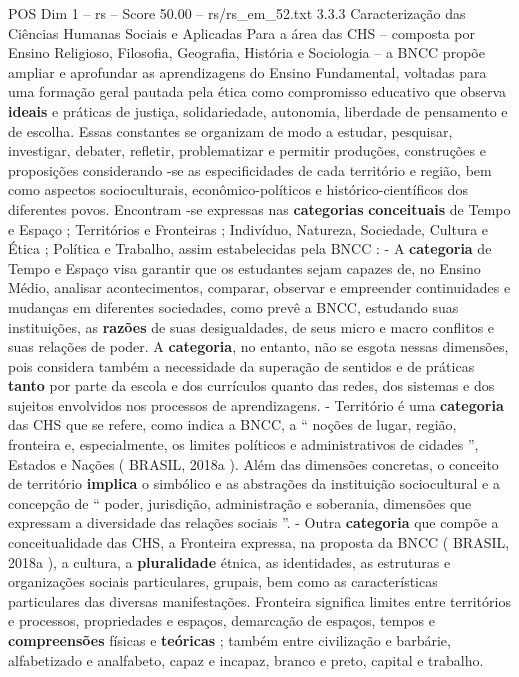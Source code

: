 \begin{textsample}{POS Dim 1 – rs – Score 50.00 – rs/rs\_em\_52.txt}  \label{ex:f1_pos_204}
3.3.3 Caracterização das Ciências Humanas Sociais e Aplicadas Para a área das CHS – composta por Ensino Religioso, Filosofia, Geografia, História e Sociologia – a BNCC propõe ampliar e aprofundar as aprendizagens do Ensino Fundamental, voltadas para uma formação geral pautada pela ética como compromisso educativo que observa \textbf{ideais} e práticas de justiça, solidariedade, autonomia, liberdade de pensamento e de escolha.
Essas constantes se organizam de modo a estudar, pesquisar, investigar, debater, refletir, problematizar e permitir produções, construções e proposições considerando -se as especificidades de cada território e região, bem como aspectos socioculturais, econômico-políticos e histórico-científicos dos diferentes povos.
Encontram -se expressas nas \textbf{categorias} \textbf{conceituais} de Tempo e Espaço ; Territórios e Fronteiras ; Indivíduo, Natureza, Sociedade, Cultura e Ética ; Política e Trabalho, assim estabelecidas pela BNCC : - A \textbf{categoria} de Tempo e Espaço visa garantir que os estudantes sejam capazes de, no Ensino Médio, analisar acontecimentos, comparar, observar e empreender continuidades e mudanças em diferentes sociedades, como prevê a BNCC, estudando suas instituições, as \textbf{razões} de suas desigualdades, de seus micro e macro conflitos e suas relações de poder.
A \textbf{categoria}, no entanto, não se esgota nessas dimensões, pois considera também a necessidade da superação de sentidos e de práticas \textbf{tanto} por parte da escola e dos currículos quanto das redes, dos sistemas e dos sujeitos envolvidos nos processos de aprendizagens. - Território é uma \textbf{categoria} das CHS que se refere, como indica a BNCC, a “ noções de lugar, região, fronteira e, especialmente, os limites políticos e administrativos de cidades ”, Estados e Nações ( BRASIL, 2018a ).
Além das dimensões concretas, o conceito de território \textbf{implica} o simbólico e as abstrações da instituição sociocultural e a concepção de “ poder, jurisdição, administração e soberania, dimensões que expressam a diversidade das relações sociais ”. - Outra \textbf{categoria} que compõe a conceitualidade das CHS, a Fronteira expressa, na proposta da BNCC ( BRASIL, 2018a ), a cultura, a \textbf{pluralidade} étnica, as identidades, as estruturas e organizações sociais particulares, grupais, bem como as características particulares das diversas manifestações.
Fronteira significa limites entre territórios e processos, propriedades e espaços, demarcação de espaços, tempos e \textbf{compreensões} físicas e \textbf{teóricas} ; também entre civilização e barbárie, alfabetizado e analfabeto, capaz e incapaz, branco e preto, capital e trabalho.

\end{textsample}
